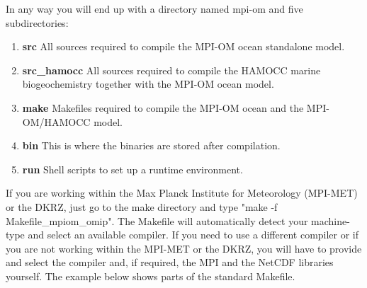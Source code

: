 In any way you will end up with a directory named mpi-om and five subdirectories:

\begin{enumerate}

\item \textbf{src}  \newline 
All sources required to compile the MPI-OM ocean standalone model. 
 
\item \textbf{src\_hamocc} \newline 
All sources required to compile the HAMOCC marine biogeochemistry together with the MPI-OM ocean model. 

\item \textbf{make} \newline 
Makefiles required to compile the MPI-OM ocean and the MPI-OM/HAMOCC model. 

\item \textbf{bin} \newline 
This is where the binaries are stored after compilation. 

\item \textbf{run} \newline 
Shell scripts to set up a runtime environment. 

\end{enumerate}

If you are working within the Max Planck Institute for Meteorology (MPI-MET) or the DKRZ,
just go to the make directory and type "make -f Makefile\_mpiom\_omip". The Makefile will 
automatically detect your machine-type and select an available compiler.
If you need to use a different compiler or if you are not working within the MPI-MET or the DKRZ,
you will have to provide and select the compiler and, if required, the MPI and the NetCDF libraries yourself.
The example below shows parts of the standard Makefile. 


